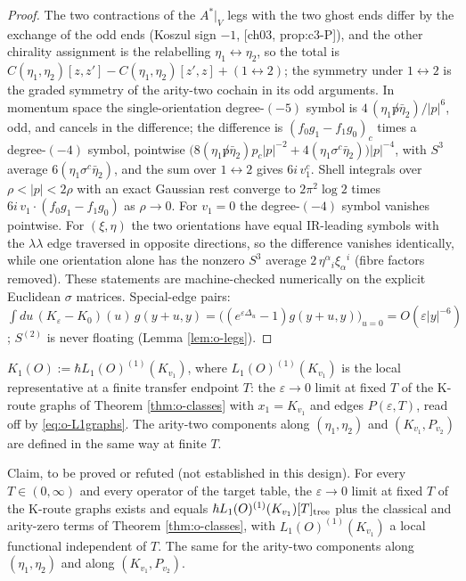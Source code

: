 \begin{proof}
The two contractions of the $A^*|_V$ legs with the two ghost ends differ by the exchange of the odd ends (Koszul sign $-1$, [ch03, prop:c3-P]), and the other chirality assignment is the relabelling $\eta_1\leftrightarrow\eta_2$, so the total is $C(\eta_1,\eta_2)[z,z']-C(\eta_1,\eta_2)[z',z]+(1\leftrightarrow2)$; the symmetry under $1\leftrightarrow2$ is the graded symmetry of the arity-two cochain in its odd arguments. In momentum space the single-orientation degree-$(-5)$ symbol is $4\,(\eta_1{\not p}\bar\eta_2)/|p|^6$, odd, and cancels in the difference; the difference is $(f_0g_1-f_1g_0)_c$ times a degree-$(-4)$ symbol, pointwise $\big(8(\eta_1{\not p}\bar\eta_2)p_c|p|^{-2}+4(\eta_1\sigma^c\bar\eta_2)\big)|p|^{-4}$, with $S^3$ average $6(\eta_1\sigma^c\bar\eta_2)$, and the sum over $1\leftrightarrow2$ gives $6i\,v_1^c$. Shell integrals over $\rho<|p|<2\rho$ with an exact Gaussian rest converge to $2\pi^2\log2$ times $6i\,v_1\cdot(f_0g_1-f_1g_0)$ as $\rho\to0$. For $v_1=0$ the degree-$(-4)$ symbol vanishes pointwise. For $(\xi,\eta)$ the two orientations have equal IR-leading symbols with the $\lambda\lambda$ edge traversed in opposite directions, so the difference vanishes identically, while one orientation alone has the nonzero $S^3$ average $2\,\eta^\alpha{}_i\xi_\alpha{}^i$ (fibre factors removed). These statements are machine-checked numerically on the explicit Euclidean $\sigma$ matrices. Special-edge pairs: $\int du\,(K_\varepsilon-K_0)(u)\,g(y+u,y)=\big((e^{\varepsilon\Delta_u}-1)g(y+u,y)\big)_{u=0}=O(\varepsilon|y|^{-6})$; $S^{(2)}$ is never floating (Lemma \ref{lem:o-legs}).
\end{proof}

\begin{definition}
\label{def:o-K}
$K_1(O):=\hbar L_1(O)^{(1)}(K_{v_1})$, where $L_1(O)^{(1)}(K_{v_1})$ is the local representative at a finite transfer endpoint $T$: the $\varepsilon\to0$ limit at fixed $T$ of the K-route graphs of Theorem \ref{thm:o-classes} with $x_1=K_{v_1}$ and edges $P(\varepsilon,T)$, read off by \eqref{eq:o-L1graphs}. The arity-two components along $(\eta_1,\eta_2)$ and $(K_{v_1},P_{v_2})$ are defined in the same way at finite $T$.
\end{definition}

\begin{proposition}
\label{prop:o-Kclaim}
Claim, to be proved or refuted (not established in this design). For every $T\in(0,\infty)$ and every operator of the target table, the $\varepsilon\to0$ limit at fixed $T$ of the K-route graphs exists and equals $\hbar L_1(O)^{(1)}(K_{v_1})[T]_{\rm tree}$ plus the classical and arity-zero terms of Theorem \ref{thm:o-classes}, with $L_1(O)^{(1)}(K_{v_1})$ a local functional independent of $T$. The same for the arity-two components along $(\eta_1,\eta_2)$ and along $(K_{v_1},P_{v_2})$.
\end{proposition}

